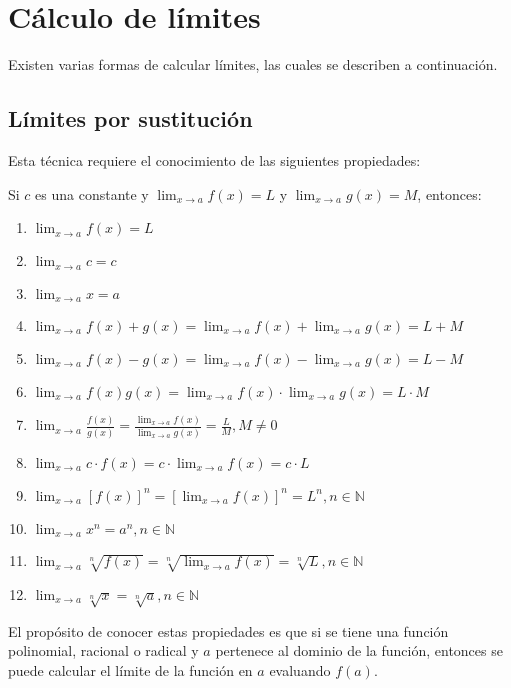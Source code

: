 \section{Cálculo de límites}

Existen varias formas de calcular límites, las cuales se describen a continuación.

\subsection{Límites por sustitución}

Esta técnica requiere el conocimiento de las siguientes propiedades:

 {
    Si $c$ es una constante y $\lim_{x \to a} f(x) = L$ y $\lim_{x \to a} g(x) = M$, entonces:

    \begin{enumerate}
        \item $\lim_{x \to a} f(x) = L$
        \item $\lim_{x \to a} c = c$
        \item $\lim_{x \to a} x = a$
        \item $\lim_{x \to a} f(x) + g(x) = \lim_{x \to a} f(x) + \lim_{x \to a} g(x) = L + M$
        \item $\lim_{x \to a} f(x) - g(x) = \lim_{x \to a} f(x) - \lim_{x \to a} g(x) = L - M$ 
        \item $\lim_{x \to a} f(x)g(x) = \lim_{x \to a} f(x) \cdot \lim_{x \to a} g(x) = L \cdot M$
        \item $\lim_{x \to a} \frac{f(x)}{g(x)} = \frac{\lim_{x \to a} f(x)}{\lim_{x \to a} g(x)} = \frac{L}{M}, M \neq 0$
        \item $\lim_{x \to a} c \cdot f(x) = c \cdot \lim_{x \to a} f(x) = c \cdot L$
        \item $\lim_{x \to a} [f(x)]^n = \left[\lim_{x \to a} f(x)\right]^n = L^n, n \in \mathbb{N}$
        \item $\lim_{x \to a} x^n = a^n, n \in \mathbb{N}$
        \item $\lim_{x \to a} \sqrt[n]{f(x)} = \sqrt[n]{\lim_{x \to a} f(x)} = \sqrt[n]{L}, n \in \mathbb{N}$
        \item $\lim_{x \to a} \sqrt[n]{x} = \sqrt[n]{a}, n \in \mathbb{N}$
    \end{enumerate}
}

El propósito de conocer estas propiedades es que si se tiene 
una función polinomial, racional o radical y $a$ pertenece al dominio de la función, 
entonces se puede calcular el límite de la función en $a$ evaluando $f(a)$. \\ 

